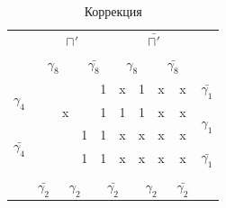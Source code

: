 \documentclass[a4paper,14pt]{article}
\begin{document}
\begin{table}[H]
	\begin{center}
		\caption{Коррекция}
		\begin{tabular}{cccccccccc}
			& \multicolumn{4}{c}{$\sqcap'$} & \multicolumn{4}{c}{$\bar{\sqcap'}$} &  \\
			& \multicolumn{2}{c}{$\gamma_8$} & \multicolumn{2}{c}{$\bar{\gamma_8}$} & \multicolumn{2}{c}{$\gamma_8$} & \multicolumn{2}{c}{$\bar{\gamma_8}$} &  \\ \cline{2-9}
			\multicolumn{1}{c|}{\multirow{2}{*}{$\gamma_4$}} & \multicolumn{1}{c|}{} & \multicolumn{1}{c|}{} & \multicolumn{1}{c|}{} & \multicolumn{1}{c|}{1} & \multicolumn{1}{c|}{x} & \multicolumn{1}{c|}{1} & \multicolumn{1}{c|}{x} & \multicolumn{1}{c|}{x} & $\bar{\gamma_1}$ \\ \cline{2-9}
			\multicolumn{1}{c|}{} & \multicolumn{1}{c|}{} & \multicolumn{1}{c|}{x} & \multicolumn{1}{c|}{} & \multicolumn{1}{c|}{1} & \multicolumn{1}{c|}{1} & \multicolumn{1}{c|}{1} & \multicolumn{1}{c|}{x} & \multicolumn{1}{c|}{x} & \multirow{2}{*}{$\gamma_1$} \\ \cline{2-9}
			\multicolumn{1}{c|}{\multirow{2}{*}{$\bar{\gamma_4}$}} & \multicolumn{1}{c|}{} & \multicolumn{1}{c|}{} & \multicolumn{1}{c|}{1} & \multicolumn{1}{c|}{1} & \multicolumn{1}{c|}{x} & \multicolumn{1}{c|}{x} & \multicolumn{1}{c|}{x} & \multicolumn{1}{c|}{x} &  \\ \cline{2-9}
			\multicolumn{1}{c|}{} & \multicolumn{1}{c|}{} & \multicolumn{1}{c|}{} & \multicolumn{1}{c|}{1} & \multicolumn{1}{c|}{1} & \multicolumn{1}{c|}{x} & \multicolumn{1}{c|}{x} & \multicolumn{1}{c|}{x} & \multicolumn{1}{c|}{x} & $\bar{\gamma_1}$ \\ \cline{2-9}
			\\
			& $\bar{\gamma_2}$ & \multicolumn{2}{c}{$\gamma_2$} & \multicolumn{2}{c}{$\bar{\gamma_2}$} & \multicolumn{2}{c}{$\gamma_2$} & $\bar{\gamma_2}$ & 
		\end{tabular}
	\end{center}
\end{table}
\end{document}
